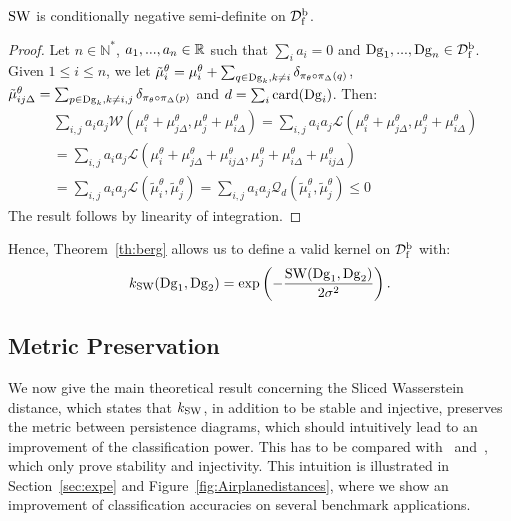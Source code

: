 \begin{lem}\label{lem:nd}
${\rm SW}$ is conditionally negative semi-definite on ${\mathcal D}_{\rm f}^{\rm b}$.
\end{lem}




\begin{proof}

Let $n\in\mathbb{N}^*$, $a_1,...,a_n\in\mathbb{R}$ such that $\sum_ia_i=0$ and $\mathrm{Dg}_1,...,\mathrm{Dg}_n\in {\mathcal D}_{\rm f}^{\rm b}$.
Given $1\leq i\leq n$, we let 
$\tilde\mu_i^\theta=\mu_i^\theta + \sum_{q\in \mathrm{Dg}_k,k\neq i}\delta_{\pi_\theta\circ\pi_\Delta(q)}$, 
$\tilde\mu_{ij\Delta}^\theta=\sum_{p\in \mathrm{Dg}_k,k\neq i,j}\delta_{\pi_\theta\circ\pi_\Delta(p)}$ and
$d=\sum_i {\rm card}(\mathrm{Dg}_i)$.
Then:
\begin{align}
&\sum_{i,j} a_ia_j \mathcal W(\mu_i^\theta+\mu_{j\Delta}^\theta,\mu_j^\theta+\mu_{i\Delta}^\theta)
=\sum_{i,j} a_ia_j\mathcal L(\mu_i^\theta+\mu_{j\Delta}^\theta,\mu_j^\theta+\mu_{i\Delta}^\theta)\nonumber \\
&=\sum_{i,j} a_ia_j\mathcal L(\mu_i^\theta+\mu_{j\Delta}^\theta+\mu_{ij\Delta}^\theta,\mu_j^\theta+\mu_{i\Delta}^\theta+\mu_{ij\Delta}^\theta)\nonumber\\
&= \sum_{i,j} a_ia_j\mathcal L(\tilde\mu_i^\theta,\tilde\mu_j^\theta)
= \sum_{i,j} a_ia_j\mathcal Q_d(\tilde\mu_i^\theta,\tilde\mu_j^\theta)\leq 0\nonumber
\end{align}  
The result follows by linearity of integration.


\end{proof}

Hence, Theorem~\ref{th:berg}
allows us to define a valid kernel on ${\mathcal D}_{\rm f}^{\rm b}$ with: 
%
\begin{equation}\label{eq:kSW}
k_{\rm SW}(\mathrm{Dg}_1,\mathrm{Dg}_2)={\rm exp}\left(-\frac{{\rm SW}(\mathrm{Dg}_1,\mathrm{Dg}_2)}{2\sigma^2}\right).
\end{equation}



\subsection{Metric Preservation}\label{sec:metricKernel}


We now give the main theoretical result concerning the Sliced Wasserstein distance, 
which states that $k_{\rm SW}$, in addition to be stable
and injective, preserves the metric between persistence diagrams, which should
intuitively lead to an improvement of the classification power. 
This has to be compared with~\cite{Reininghaus15} and~\cite{Kusano16}, which
only prove stability and injectivity. 
This intuition is illustrated in Section~\ref{sec:expe} and
Figure~\ref{fig:Airplanedistances}, where we show an improvement of
classification accuracies on several benchmark applications.

